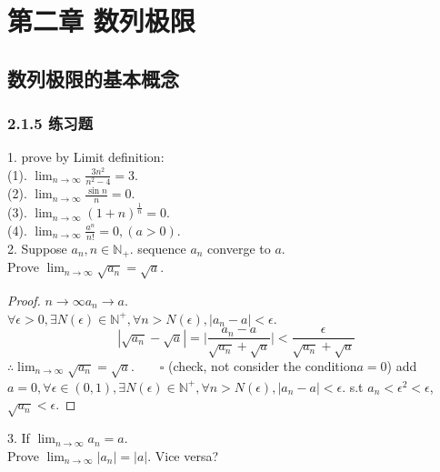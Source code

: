 \chapter{第二章 数列极限}
\section{数列极限的基本概念}
\subsection{2.1.5 练习题}
\date{2021.5.5}
1. prove by Limit definition:\\
(1). $ \lim_{n\rightarrow\infty}\frac{3n^2}{n^2-4} = 3 $.\\
(2). $ \lim_{n\rightarrow\infty}\frac{\sin n}{n} = 0 $.\\
(3). $ \lim_{n\rightarrow\infty}(1+n)^\frac{1}{n} = 0 $.\\
(4). $ \lim_{n\rightarrow\infty}\frac{a^n}{n!} = 0, (a>0) $.\\

2. Suppose $ a_n, n\in\mathbb{N}_+ $. sequence {$ a_n $} converge to $ a $.\\ Prove $ \lim_{n\rightarrow\infty}\sqrt{a_n} = \sqrt{a} $.

\begin{proof}
$ n\rightarrow\infty  a_n \rightarrow a $.\\
$ \forall \epsilon >0, \exists N(\epsilon) \in \mathbb{N}^+, \forall n>N(\epsilon), |a_n - a|<\epsilon $.
\begin{equation*}
	|\sqrt{a_n}-\sqrt{a}| = \Big|\frac{a_n-a}{\sqrt{a_n}+\sqrt{a}}\Big| < \frac{\epsilon}{\sqrt{a_n}+\sqrt{a}}
\end{equation*}
$ \therefore \lim_{n\rightarrow\infty}\sqrt{a_n} = \sqrt{a}. \qquad\square  $
(check, not consider the condition$ a=0 $)
add $ a=0, \forall \epsilon \in (0,1), \exists N(\epsilon) \in \mathbb{N}^+, \forall n>N(\epsilon), |a_n - a|<\epsilon $. s.t $ a_n<\epsilon^2 <\epsilon $, $ \sqrt{a_n} < \epsilon $.
\end{proof}

3. If $ \lim_{n\rightarrow\infty} a_n = a $.\\ Prove $ \lim_{n\rightarrow\infty} |a_n| = |a| $. Vice versa?\\

